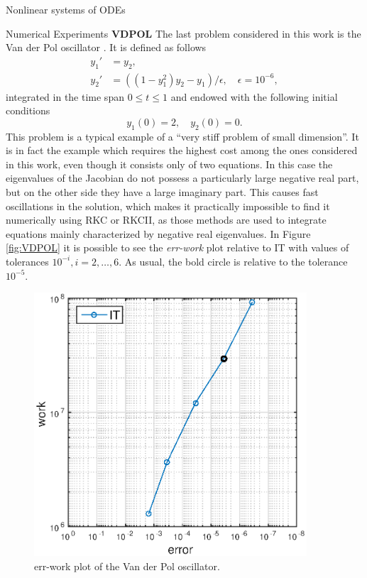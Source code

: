 \documentclass{article}
\begin{document}
\begin{section}{Nonlinear systems of ODEs}
\begin{subsection}{Numerical Experiments}
\textbf{VDPOL} The last problem considered in this work is the Van der Pol oscillator \cite{HW}. It is defined as follows
\begin{equation}\label{eq:VDPOL}
\begin{aligned}
	y_1' &= y_2, \\
	y_2' &= ((1 - y_1^2)y_2 - y_1)/\epsilon, \quad \epsilon = 10^{-6},
\end{aligned}
\end{equation} 
integrated in the time span $0 \leq t \leq 1$ and endowed with the following initial conditions
\begin{equation*}
	y_1(0) = 2, \quad y_2(0) = 0.
\end{equation*}
This problem is a typical example of a ``very stiff problem of small dimension''\cite{HW}. It is in fact the example which requires the highest cost among the ones considered in this work, even though it consists only of two equations. In this case the eigenvalues of the Jacobian do not possess a particularly large negative real part, but on the other side they have a large imaginary part. This causes fast oscillations in the solution, which makes it practically impossible to find it numerically using RKC or RKCII, as those methods are used to integrate equations mainly characterized by negative real eigenvalues. In Figure \ref{fig:VDPOL} it is possible to see the \textit{err-work} plot relative to IT with values of tolerances $10^{-i},i=2,\dots,6$. As usual, the bold circle is relative to the tolerance $10^{-5}$.
\begin{figure}[t!]
\centering
\includegraphics [width=4in]{Pictures/VDPOL.eps}
\caption{err-work plot of the Van der Pol oscillator.}

\end{figure}
\end{subsection}
\end{section}
\end{document}
